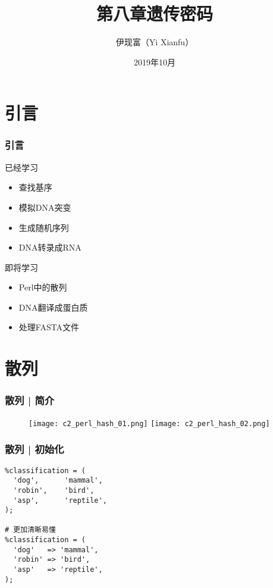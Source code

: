


\title[遗传密码]{第八章\quad 遗传密码}
\author[Yixf]{伊现富（Yi Xianfu）}
\date{2019年10月}



\section{引言}
\begin{frame}
  \frametitle{引言}
  \begin{block}{已经学习}
    \begin{itemize}
      \item 查找基序
      \item 模拟DNA突变
      \item 生成随机序列
      \item DNA转录成RNA
    \end{itemize}
  \end{block}
  \pause
  \begin{block}{即将学习}
    \begin{itemize}
      \item Perl中的散列
      \item DNA翻译成蛋白质
      \item 处理FASTA文件
    \end{itemize}
  \end{block}
\end{frame}

\section{散列}
\begin{frame}
  \frametitle{散列 | 简介}
  \begin{figure}
  \centering
  \texttt{[image: c2\_perl\_hash\_01.png]}\qquad
  \texttt{[image: c2\_perl\_hash\_02.png]}
  \end{figure}
\end{frame}

\begin{frame}[fragile]
  \frametitle{散列 | \alert{初始化}}
\begin{lstlisting}
%classification = (
  'dog',      'mammal',
  'robin',    'bird',
  'asp',      'reptile',
);

# 更加清晰易懂
%classification = (
  'dog'   => 'mammal',
  'robin' => 'bird',
  'asp'   => 'reptile',
);
\end{lstlisting}
\end{frame}

